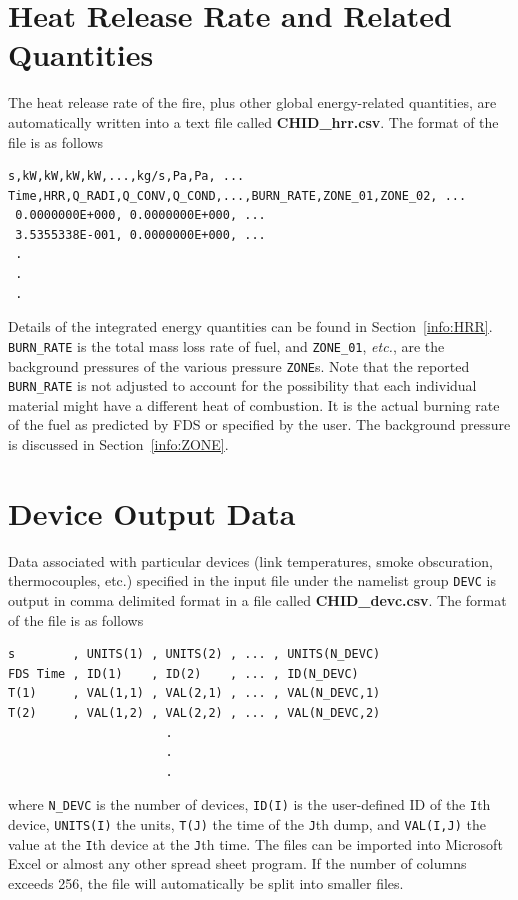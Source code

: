 \documentclass[11pt]{book}
\newcommand{\ct}{\tt\small}
\begin{document}
\section{Heat Release Rate and Related Quantities}

\label{out:hrr}
The heat release rate of the fire, plus other global energy-related quantities, are automatically written into a text file
called {\bf CHID\_hrr.csv}. The format of the file is as follows

\footnotesize
\begin{verbatim}
s,kW,kW,kW,kW,...,kg/s,Pa,Pa, ...
Time,HRR,Q_RADI,Q_CONV,Q_COND,...,BURN_RATE,ZONE_01,ZONE_02, ...
 0.0000000E+000, 0.0000000E+000, ...
 3.5355338E-001, 0.0000000E+000, ...
 .
 .
 .
 \end{verbatim}
\normalsize

\noindent
Details of the integrated energy quantities can be found in Section~\ref{info:HRR}.
{\ct BURN\_RATE} is the total mass loss rate of fuel, and {\ct ZONE\_01}, {\em etc.}, are the background pressures of the various
pressure {\ct ZONE}s. Note that the reported {\ct BURN\_RATE} is not adjusted to account for the possibility that each individual
material might have a different heat of combustion. It is the actual burning rate of the fuel as predicted by FDS or specified by the user.
The background pressure is discussed in Section~\ref{info:ZONE}.





\section{Device Output Data}
\label{out:DEVC}

Data associated with particular devices (link temperatures, smoke obscuration, thermocouples, etc.)
specified in the input file under the namelist
group {\ct DEVC} is output in comma delimited format in a file called
{\bf CHID\_devc.csv}. The format of the file is as follows

\footnotesize
\begin{verbatim}
s        , UNITS(1) , UNITS(2) , ... , UNITS(N_DEVC)
FDS Time , ID(1)    , ID(2)    , ... , ID(N_DEVC)
T(1)     , VAL(1,1) , VAL(2,1) , ... , VAL(N_DEVC,1)
T(2)     , VAL(1,2) , VAL(2,2) , ... , VAL(N_DEVC,2)
                      .
                      .
                      .
\end{verbatim}
\normalsize
where {\ct N\_DEVC} is the number of devices, {\ct ID(I)} is the user-defined
ID of the {\ct I}th device,
{\ct UNITS(I)} the units, {\ct T(J)} the time of the {\ct J}th dump, and
{\ct VAL(I,J)} the value at the {\ct I}th device at the {\ct J}th time.
The files can be imported into Microsoft Excel or almost any other
spread sheet program. If the number of columns exceeds 256, the file will
automatically be split into smaller files.
\end{document}
